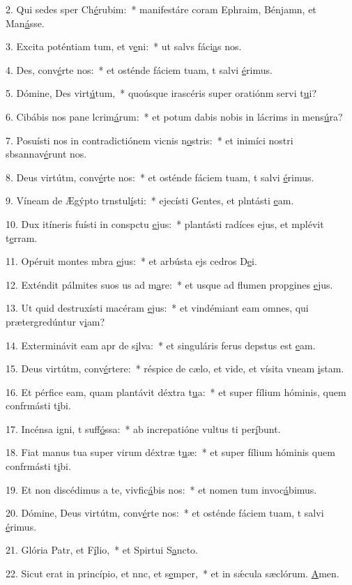 2. Qui sedes sper Ch\uline{é}rubim:~* manifestáre coram Ephraim, Bénjamn, et Man\uline{á}sse.\par 
3. Excita poténtiam tum, et v\uline{e}ni:~* ut salvs fáci\uline{a}s nos.\par 
4. Des, conv\uline{é}rte nos:~* et osténde fáciem tuam, t salvi \uline{é}rimus.\par 
5. Dómine, Des virt\uline{ú}tum,~* quoúsque irascéris super oratiónm servi t\uline{u}i?\par 
6. Cibábis nos pane lcrim\uline{á}rum:~* et potum dabis nobis in lácrims in mens\uline{ú}ra?\par 
7. Posuísti nos in contradictiónem vicnis n\uline{o}stris:~* et inimíci nostri sbsannav\uline{é}runt nos.\par 
8. Deus virtútm, conv\uline{é}rte nos:~* et osténde fáciem tuam, t salvi \uline{é}rimus.\par 
9. Víneam de Ægýpto trnstul\uline{í}sti:~* ejecísti Gentes, et plntásti \uline{e}am.\par 
10. Dux itíneris fuísti in conspctu \uline{e}jus:~* plantásti radíces ejus, et mplévit t\uline{e}rram.\par 
11. Opéruit montes mbra \uline{e}jus:~* et arbústa ejs cedros D\uline{e}i.\par 
12. Exténdit pálmites suos us ad m\uline{a}re:~* et usque ad flumen propgines \uline{e}jus.\par 
13. Ut quid destruxísti macéram \uline{e}jus:~* et vindémiant eam omnes, qui prætergredúntur v\uline{i}am?\par 
14. Exterminávit eam apr de s\uline{i}lva:~* et singuláris ferus depstus est \uline{e}am.\par 
15. Deus virtútm, conv\uline{é}rtere:~* réspice de cælo, et vide, et vísita vneam \uline{i}stam.\par 
16. Et pérfice eam, quam plantávit déxtra t\uline{u}a:~* et super fílium hóminis, quem confrmásti t\uline{i}bi.\par 
17. Incénsa igni, t suff\uline{ó}ssa:~* ab increpatióne vultus ti per\uline{í}bunt.\par 
18. Fiat manus tua super virum déxtræ t\uline{u}æ:~* et super fílium hóminis quem confrmásti t\uline{i}bi.\par 
19. Et non discédimus a te, vivfic\uline{á}bis nos:~* et nomen tum invoc\uline{á}bimus.\par 
20. Dómine, Deus virtútm, conv\uline{é}rte nos:~* et osténde fáciem tuam, t salvi \uline{é}rimus.\par 
21. Glória Patr, et F\uline{í}lio,~* et Spirtui S\uline{a}ncto.\par 
22. Sicut erat in princípio, et nnc, et s\uline{e}mper,~* et in sǽcula sæclórum. \uline{A}men.\par 
